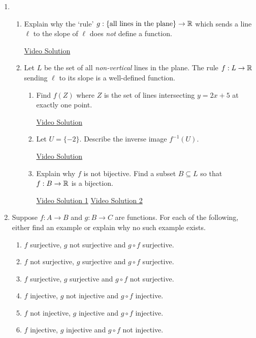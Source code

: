 \begin{enumerate}
	\item\begin{enumerate}
    \item Explain why the `rule' $g:\{\text{all lines in the plane}\}\to\mathbb{R}$ which sends a line $\ell$ to the slope of $\ell$ does \emph{not} define a function.
    
    \href{https://youtu.be/HHX_f3KIVUw}{Video Solution}
    
    
    \item Let $L$ be the set of all \emph{non-vertical} lines in the plane. The rule $f:L\to\mathbb{R}$ sending $\ell$ to its slope is a well-defined function.
    \begin{enumerate} 
      \item Find $f(Z)$ where $Z$ is the set of lines intersecting $y=2x+5$ at exactly one point. 
    
    	\href{https://youtu.be/evTJt6VCg1Y}{Video Solution}
    
    	\item Let $U=\{-2\}$. Describe the inverse image $f^{-1}(U)$.
    
    	\href{https://youtu.be/FTLwdH1NZ-k}{Video Solution}
    
    	\item Explain why $f$ is not bijective. Find a subset $B\subseteq L$ so that $f:B\to\mathbb{R}$ is a bijection.

    	\href{https://youtu.be/TklbTQpXrMo}{Video Solution 1}\qquad
    	\href{https://youtu.be/eubplxO4Y_w}{Video Solution 2}
		\end{enumerate}
	\end{enumerate}


	\item Suppose $f:A\to B$ and $g:B\to C$ are functions. For each of the following, either find an example or explain why no such example exists.
	\begin{enumerate}
    \item $f$ surjective, $g$ not surjective and $g \circ f$ surjective. 
    \item $f$ not surjective, $g$ surjective and $g \circ f$ surjective. 
    \item $f$ surjective, $g$ surjective and $g \circ f$ not surjective. 
    \item $f$ injective, $g$ not injective and $g \circ f$ injective.  
    \item $f$ not injective, $g$ injective and $g \circ f$ injective.   
    \item $f$ injective, $g$ injective and $g \circ f$ not injective.  
	\end{enumerate}


\end{enumerate}
